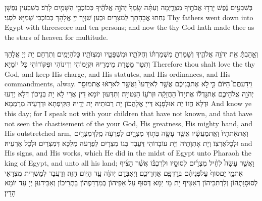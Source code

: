 {בְּשִׁבְעִ֣ים נֶ֔פֶשׁ יָרְד֥וּ אֲבֹתֶ֖יךָ מִצְרָ֑יְמָה וְעַתָּ֗ה שָֽׂמְךָ֙ יְהֹוָ֣ה אֱלֹהֶ֔יךָ כְּכוֹכְבֵ֥י הַשָּׁמַ֖יִם לָרֹֽב׃}
{בְּשִׁבְעִין נַפְשָׁן נְחַתוּ אֲבָהָתָךְ לְמִצְרָיִם וּכְעַן שַׁוְּיָךְ יְיָ אֱלָהָךְ כְּכוֹכְבֵי שְׁמַיָּא לִסְגֵּי׃}
{Thy fathers went down into Egypt with threescore and ten persons; and now the \lord\space thy God hath made thee as the stars of heaven for multitude.}{}

\newperek
{}%
{וְאָ֣הַבְתָּ֔ אֵ֖ת יְהֹוָ֣ה אֱלֹהֶ֑יךָ וְשָׁמַרְתָּ֣ מִשְׁמַרְתּ֗וֹ וְחֻקֹּתָ֧יו וּמִשְׁפָּטָ֛יו וּמִצְוֺתָ֖יו כׇּל\maqqaf הַיָּמִֽים׃}
{וְתִרְחַם יָת יְיָ אֱלָהָךְ וְתִטַּר מַטְּרַת מֵימְרֵיהּ וּקְיָמוֹהִי וְדִינוֹהִי וּפִקּוֹדוֹהִי כָּל יוֹמַיָּא׃}
{Therefore thou shalt love the \lord\space thy God, and keep His charge, and His statutes, and His ordinances, and His commandments, alway.}{}
{וִֽידַעְתֶּם֮ הַיּוֹם֒ כִּ֣י \legarmeh  לֹ֣א אֶת\maqqaf בְּנֵיכֶ֗ם אֲשֶׁ֤ר לֹֽא\maqqaf יָדְעוּ֙ וַאֲשֶׁ֣ר לֹא\maqqaf רָא֔וּ אֶת\maqqaf מוּסַ֖ר יְהֹוָ֣ה אֱלֹהֵיכֶ֑ם אֶת\maqqaf גׇּדְל֕וֹ אֶת\maqqaf יָדוֹ֙ הַחֲזָקָ֔ה וּזְרֹע֖וֹ הַנְּטוּיָֽה׃}
{וְתִדְּעוּן יוֹמָא דֵין אֲרֵי לָא יָת בְּנֵיכוֹן דְּלָא יְדַעוּ וּדְלָא חֲזוֹ יָת אוּלְפָנָא דַּייָ אֱלָהֲכוֹן יָת רְבוּתֵיהּ יָת יְדֵיהּ תַּקִּיפְתָא וּדְרָעֵיהּ מְרָמְמָא׃}
{And know ye this day; for I speak not with your children that have not known, and that have not seen the chastisement of the \lord\space your God, His greatness, His mighty hand, and His outstretched arm,}{}
{וְאֶת\maqqaf אֹֽתֹתָיו֙ וְאֶֽת\maqqaf מַעֲשָׂ֔יו אֲשֶׁ֥ר עָשָׂ֖ה בְּת֣וֹךְ מִצְרָ֑יִם לְפַרְעֹ֥ה מֶֽלֶךְ\maqqaf מִצְרַ֖יִם וּלְכׇל\maqqaf אַרְצֽוֹ׃}
{וְיָת אָתְוָתֵיהּ וְיָת עוֹבָדוֹהִי דַּעֲבַד בְּגוֹ מִצְרָיִם לְפַרְעֹה מַלְכָּא דְּמִצְרַיִם וּלְכָל אַרְעֵיהּ׃}
{and His signs, and His works, which He did in the midst of Egypt unto Pharaoh the king of Egypt, and unto all his land;}{}
{וַאֲשֶׁ֣ר עָשָׂה֩ לְחֵ֨יל מִצְרַ֜יִם לְסוּסָ֣יו וּלְרִכְבּ֗וֹ אֲשֶׁ֨ר הֵצִ֜יף אֶת\maqqaf מֵ֤י יַם\maqqaf סוּף֙ עַל\maqqaf פְּנֵיהֶ֔ם בְּרׇדְפָ֖ם אַחֲרֵיכֶ֑ם וַיְאַבְּדֵ֣ם יְהֹוָ֔ה עַ֖ד הַיּ֥וֹם הַזֶּֽה׃}
{וְדַעֲבַד לְמַשְׁרִית מִצְרָאֵי לְסוּסָוָתְהוֹן וְלִרְתִכֵּיהוֹן דְּאַטֵּיף יָת מֵי יַמָּא דְּסוּף עַל אַפֵּיהוֹן בְּמִרְדַּפְהוֹן בָּתְרֵיכוֹן וְאַבֵּידִנּוּן יְיָ עַד יוֹמָא הָדֵין׃}
